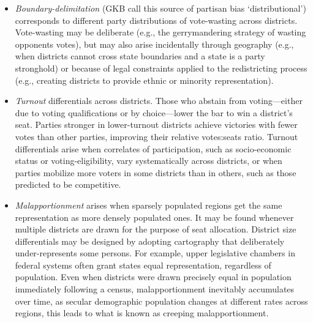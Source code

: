 \documentclass[letter,12pt]{article}
\begin{document}
\begin{itemize}
\item \emph{Boundary-delimitation} (GKB call this source of partisan bias `distributional') corresponds to different party distributions of vote-wasting across districts. Vote-wasting may be deliberate (e.g., the gerrymandering strategy of wasting opponents votes), but may also arise incidentally through geography (e.g., when districts cannot cross state boundaries and a state is a party stronghold) or because of legal constraints applied to the redistricting process (e.g., creating districts to provide ethnic or minority representation).
\item \emph{Turnout} differentials across districts. Those who abstain from voting---either due to voting qualifications or by choice---lower the bar to win a district's seat. Parties stronger in lower-turnout districts achieve victories with fewer votes than other parties, improving their relative votes:seats ratio. Turnout differentials arise when correlates of participation, such as socio-economic status or voting-eligibility, vary systematically across districts, or when parties mobilize more voters in some districts than in others, such as those predicted to be competitive.
\item \emph{Malapportionment} arises when sparsely populated regions get the same representation as more densely populated ones. It may be found whenever multiple districts are drawn for the purpose of seat allocation. District size differentials may be designed by adopting cartography that deliberately under-represents some persons. For example, upper legislative chambers in federal systems often grant states equal representation, regardless of population. Even when districts were drawn precisely equal in population immediately following a census, malapportionment inevitably accumulates over time, as secular demographic population changes at different rates across regions, this leads to what is known as creeping malapportionment.
\end{itemize} 

\end{document}

